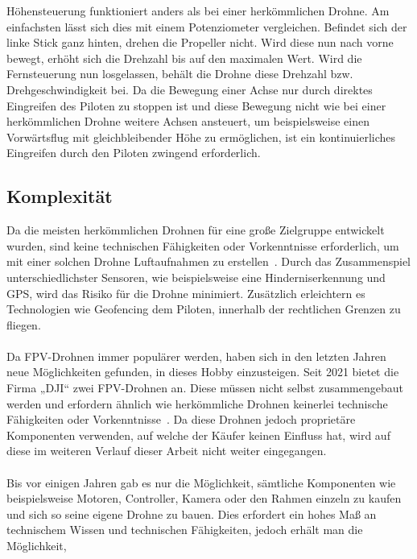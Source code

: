         Höhensteuerung funktioniert anders als bei einer herkömmlichen Drohne. Am einfachsten lässt sich dies mit
        einem Potenziometer vergleichen. Befindet sich der linke Stick ganz hinten, drehen die Propeller nicht.
        Wird diese nun nach vorne bewegt, erhöht sich die Drehzahl bis auf den maximalen Wert. Wird die Fernsteuerung
        nun losgelassen, behält die Drohne diese Drehzahl bzw. Drehgeschwindigkeit bei. Da die Bewegung einer Achse
        nur durch direktes Eingreifen des Piloten zu stoppen ist und diese Bewegung nicht wie bei einer herkömmlichen
        Drohne weitere Achsen ansteuert, um beispielsweise einen Vorwärtsflug mit gleichbleibender Höhe zu ermöglichen,
        ist ein kontinuierliches Eingreifen durch den Piloten zwingend erforderlich.
        
    \newpage       
    \subsection[Komplexität]{Komplexität}
        Da die meisten herkömmlichen Drohnen für eine große Zielgruppe entwickelt wurden, sind keine technischen
        Fähigkeiten oder Vorkenntnisse erforderlich, um mit einer solchen Drohne Luftaufnahmen zu erstellen~\cite{shon2022}.
        Durch das Zusammenspiel unterschiedlichster Sensoren, wie beispielsweise eine Hinderniserkennung und GPS,
        wird das Risiko für die Drohne minimiert. Zusätzlich erleichtern es Technologien wie Geofencing dem Piloten,
        innerhalb der rechtlichen Grenzen zu fliegen. \\
        \\
        Da FPV-Drohnen immer populärer werden, haben sich in den letzten Jahren neue Möglichkeiten gefunden, in
        dieses Hobby einzusteigen. Seit 2021 bietet die Firma „DJI“ zwei FPV-Drohnen an. Diese müssen nicht selbst
        zusammengebaut werden und erfordern ähnlich wie herkömmliche Drohnen keinerlei technische Fähigkeiten oder
        Vorkenntnisse~\cite{DJIAvatar}\cite{DJIFpv}. Da diese Drohnen jedoch proprietäre Komponenten verwenden, auf welche der Käufer keinen Einfluss
        hat, wird auf diese im weiteren Verlauf dieser Arbeit nicht weiter eingegangen. \\
        \\
        Bis vor einigen Jahren gab es nur die Möglichkeit, sämtliche Komponenten wie beispielsweise Motoren,
        Controller, Kamera oder den Rahmen einzeln zu kaufen und sich so seine eigene Drohne zu bauen. Dies
        erfordert ein hohes Maß an technischem Wissen und technischen Fähigkeiten, jedoch erhält man die Möglichkeit,
